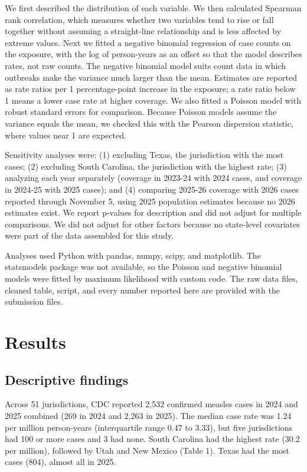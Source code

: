 \documentclass[12pt]{article}
\begin{document}
We first described the distribution of each variable. We then calculated Spearman rank correlation, which measures whether two variables tend to rise or fall together without assuming a straight-line relationship and is less affected by extreme values. Next we fitted a negative binomial regression of case counts on the exposure, with the log of person-years as an offset so that the model describes rates, not raw counts. The negative binomial model suits count data in which outbreaks make the variance much larger than the mean. Estimates are reported as rate ratios per 1 percentage-point increase in the exposure; a rate ratio below 1 means a lower case rate at higher coverage. We also fitted a Poisson model with robust standard errors for comparison. Because Poisson models assume the variance equals the mean, we checked this with the Pearson dispersion statistic, where values near 1 are expected.

Sensitivity analyses were: (1) excluding Texas, the jurisdiction with the most cases; (2) excluding South Carolina, the jurisdiction with the highest rate; (3) analyzing each year separately (coverage in 2023-24 with 2024 cases, and coverage in 2024-25 with 2025 cases); and (4) comparing 2025-26 coverage with 2026 cases reported through November 5, using 2025 population estimates because no 2026 estimates exist. We report p-values for description and did not adjust for multiple comparisons. We did not adjust for other factors because no state-level covariates were part of the data assembled for this study.

Analyses used Python with pandas, numpy, scipy, and matplotlib. The statsmodels package was not available, so the Poisson and negative binomial models were fitted by maximum likelihood with custom code. The raw data files, cleaned table, script, and every number reported here are provided with the submission files.

\section*{Results}
\subsection*{Descriptive findings}

Across 51 jurisdictions, CDC reported 2,532 confirmed measles cases in 2024 and 2025 combined (269 in 2024 and 2,263 in 2025). The median case rate was 1.24 per million person-years (interquartile range 0.47 to 3.33), but five jurisdictions had 100 or more cases and 3 had none. South Carolina had the highest rate (30.2 per million), followed by Utah and New Mexico (Table 1). Texas had the most cases (804), almost all in 2025.
\end{document}
